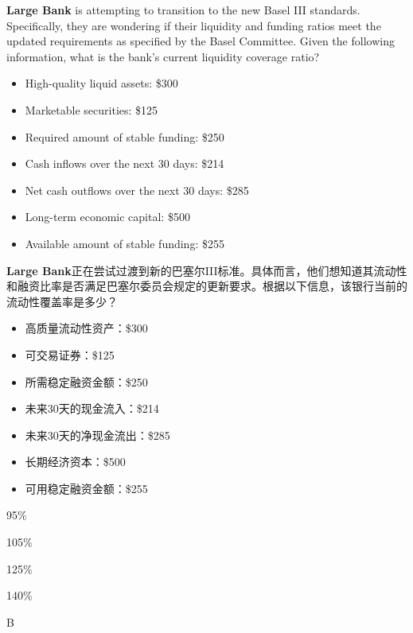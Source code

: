 \documentclass{article}
\newcounter{question} %
\begin{document}
\begin{question}
    \textbf{Large Bank} is attempting to transition to the new Basel III standards. Specifically, they are wondering if their liquidity and funding ratios meet the updated requirements as specified by the Basel Committee. Given the following information, what is the bank's current liquidity coverage ratio?

    \begin{itemize}
        \item High-quality liquid assets: \$300
        \item Marketable securities: \$125
        \item Required amount of stable funding: \$250
        \item Cash inflows over the next 30 days: \$214
        \item Net cash outflows over the next 30 days: \$285
        \item Long-term economic capital: \$500
        \item Available amount of stable funding: \$255
    \end{itemize}
    \textbf{Large Bank}正在尝试过渡到新的巴塞尔III标准。具体而言，他们想知道其流动性和融资比率是否满足巴塞尔委员会规定的更新要求。根据以下信息，该银行当前的流动性覆盖率是多少？

    \begin{itemize}
        \item 高质量流动性资产：\$300
        \item 可交易证券：\$125
        \item 所需稳定融资金额：\$250
        \item 未来30天的现金流入：\$214
        \item 未来30天的净现金流出：\$285
        \item 长期经济资本：\$500
        \item 可用稳定融资金额：\$255
    \end{itemize}
\end{question}

\begin{choices}
    \item 95\%
    \item 105\%
    \item 125\%
    \item 140\%
\end{choices}

\begin{correctanswer}
    B
\end{correctanswer}
\end{document}
